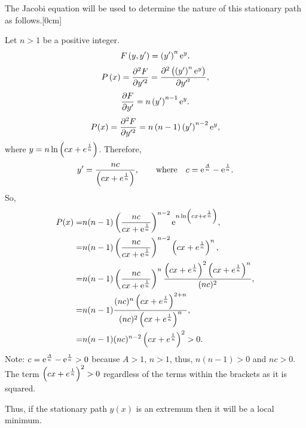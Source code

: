 The Jacobi equation will be used to determine the nature of this stationary path as follows.[0cm]

Let $n > 1$ be a positive integer.
\[
	F\left(y,y^\prime\right) = \left(y^\prime\right)^n\mathrm{e}^y.
\]
\[
	P\left(x\right) = \frac{\partial ^2F}{\partial y^{\prime2}} = \frac{\partial ^2\left(\left(y^\prime\right)^n\mathrm{e}^y\right)}{\partial y^{\prime^2}},
\]
\[
	\frac{\partial F}{\partial y^\prime} = n\left(y^\prime\right)^{n-1}\mathrm{e}^y.
\]
\[
	P(x)=\frac{\partial ^2F}{\partial y^{\prime2}} = n\left(n-1\right)\left(y^\prime\right)^{n-2}\mathrm{e}^y,
\]
where $y = n\ln\left(cx + e^{\frac{1}{n}}\right)$. Therefore,
\[
	y^\prime = \frac{nc}{\left(cx + e^{\frac{1}{n}}\right)},\qquad\textrm{where}\quad c=\mathrm{e}^{\frac{A}{n}} - \mathrm{e}^{\frac{1}{n}}.
\]
So,
\begin{align*}
	P(x) =& n(n-1)\left(\dfrac{nc}{cx + \mathrm{e}^{\frac{1}{n}}}\right)^{n-2}\mathrm{e}^{ n\ln\left(cx + e^{\frac{1}{n}}\right)},\\
		 =& n(n-1)\left(\dfrac{nc}{cx + \mathrm{e}^{\frac{1}{n}}}\right)^{n-2}\left(cx + e^{\frac{1}{n}}\right)^n,\\
		 =& n(n-1)\left(\dfrac{nc}{cx + \mathrm{e}^{\frac{1}{n}}}\right)^{n}\frac{\left(cx + e^{\frac{1}{n}}\right)^2\left(cx + e^{\frac{1}{n}}\right)^n}{(nc)^2},\\
		 =& n(n-1)\frac{(nc)^n\left(cx + e^{\frac{1}{n}}\right)^{2+n}}{(nc)^2\left(cx + e^{\frac{1}{n}}\right)^{n}},\\
		 =& n(n-1)(nc)^{n-2}\left(cx + e^{\frac{1}{n}}\right)^{2} > 0.
\end{align*}
Note: $c=\mathrm{e}^{\frac{A}{n}} - \mathrm{e}^{\frac{1}{n}} > 0$ because $A>1$, $n>1$, thus, $n(n-1) > 0$ and $nc>0$. The term $\left(cx + e^{\frac{1}{n}}\right)^{2} > 0$ regardless of the  terms within the brackets as it is squared.

Thus, if the stationary path $y(x)$ is an extremum then it will be a local minimum.

